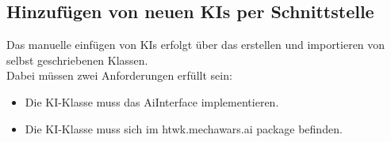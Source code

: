 \documentclass[12pt,a4paper,oneside]{book}
\theoremstyle{plain}
\numberwithin{equation}{chapter} \DeclareMathOperator{\Var}{Var}
\begin{document}
\subsection*{Hinzufügen von neuen KIs per Schnittstelle}
    Das manuelle einfügen von KIs erfolgt über das erstellen und importieren von selbst geschriebenen Klassen.\\
    Dabei müssen zwei Anforderungen erfüllt sein:
    \begin{itemize}
        \item Die KI-Klasse muss das AiInterface implementieren.
        \item Die KI-Klasse muss sich im htwk.mechawars.ai package befinden.
    \end{itemize}
    
    \newpage
    
\end{document}
